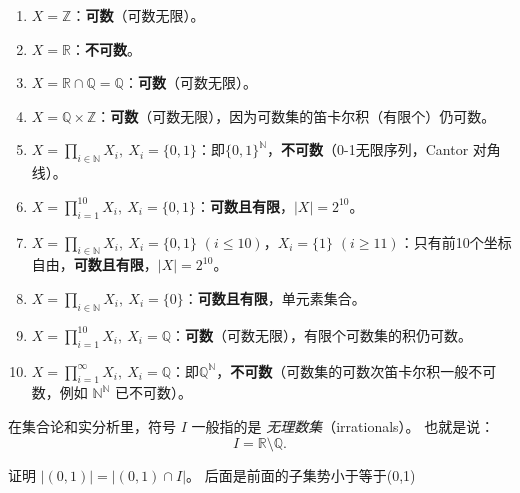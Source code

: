 \begin{solution}
\begin{enumerate}[(1)]
  \item $X=\mathbb Z$：\textbf{可数}（可数无限）。
  \item $X=\mathbb R$：\textbf{不可数}。
  \item $X=\mathbb R\cap\mathbb Q=\mathbb Q$：\textbf{可数}（可数无限）。
  \item $X=\mathbb Q\times\mathbb Z$：\textbf{可数}（可数无限），因为可数集的笛卡尔积（有限个）仍可数。
  \item $X=\prod_{i\in\mathbb N}X_i,\ X_i=\{0,1\}$：即$\{0,1\}^{\mathbb N}$，\textbf{不可数}（0-1无限序列，Cantor 对角线）。
  \item $X=\prod_{i=1}^{10}X_i,\ X_i=\{0,1\}$：\textbf{可数且有限}，$|X|=2^{10}$。
  \item $X=\prod_{i\in\mathbb N}X_i,\ X_i=\{0,1\}$ $(i\le 10)$，$X_i=\{1\}$ $(i\ge 11)$：只有前10个坐标自由，\textbf{可数且有限}，$|X|=2^{10}$。
  \item $X=\prod_{i\in\mathbb N}X_i,\ X_i=\{0\}$：\textbf{可数且有限}，单元素集合。
  \item $X=\prod_{i=1}^{10}X_i,\ X_i=\mathbb Q$：\textbf{可数}（可数无限），有限个可数集的积仍可数。
  \item $X=\prod_{i=1}^{\infty}X_i,\ X_i=\mathbb Q$：即$\mathbb Q^{\mathbb N}$，\textbf{不可数}（可数集的可数次笛卡尔积一般不可数，例如 $\mathbb N^{\mathbb N}$ 已不可数）。
\end{enumerate}
\end{solution}

在集合论和实分析里，符号 $I$ 一般指的是 \emph{无理数集}（irrationals）。  
也就是说：
\[
I = \mathbb{R} \setminus \mathbb{Q}.
\]

\begin{homework}[1.19]
证明 $|(0,1)| = |(0,1)\cap I|$。
后面是前面的子集势小于等于(0,1)
\end{homework}

